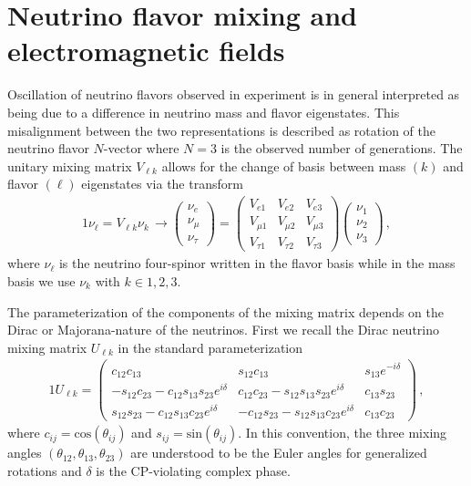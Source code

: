 \section{Neutrino flavor mixing and electromagnetic fields}
\label{sec:nuflavor}
Oscillation of neutrino flavors observed in experiment is in general interpreted as being due to a difference in neutrino mass and flavor eigenstates. This misalignment between the two representations is described as rotation of the neutrino flavor $N$-vector where $N=3$ is the observed number of generations. The unitary mixing matrix $V_{\ell k}$ allows for the change of basis between mass $(k)$ and flavor $(\ell)$ eigenstates via the transform 
\begin{alignat}{1}
    \label{basis:1} \nu_{\ell}=V_{\ell k}\nu_{k}\,\rightarrow
    \begin{pmatrix}
        \nu_{e}\\
        \nu_{\mu}\\
        \nu_{\tau}
    \end{pmatrix}=
    \begin{pmatrix}
        V_{e1} & V_{e2} & V_{e3}\\
        V_{\mu1} & V_{\mu2} & V_{\mu3}\\
        V_{\tau1} & V_{\tau2} & V_{\tau3}
    \end{pmatrix}
    \begin{pmatrix}
        \nu_{1}\\
        \nu_{2}\\
        \nu_{3}
    \end{pmatrix}\,,
\end{alignat}
where $\nu_{\ell}$ is the neutrino four-spinor written in the flavor basis while in the mass basis we use $\nu_{k}$ with $k\in1,2,3$.

The parameterization of the components of the mixing matrix depends on the Dirac or Majorana-nature of the neutrinos. First we recall the Dirac neutrino mixing matrix $U_{\ell k}$ in the standard parameterization~\citep{Xing:2014wwa,Schwartz:2014sze} 
\begin{alignat}{1}
    \label{rotation:1} U_{\ell k} =
    \begin{pmatrix}
         c_{12}c_{13} & s_{12}c_{13} & s_{13}e^{-i\delta}\\
         -s_{12}c_{23} - c_{12}s_{13}s_{23}e^{i\delta} & c_{12}c_{23} - s_{12}s_{13}s_{23}e^{i\delta} & c_{13}s_{23}\\
         s_{12}s_{23} - c_{12}s_{13}c_{23}e^{i\delta}& -c_{12}s_{23} - s_{12}s_{13}c_{23}e^{i\delta} & c_{13}c_{23}
    \end{pmatrix}\,,
\end{alignat}
where $c_{ij} = \mathrm{cos}(\theta_{ij})$ and $s_{ij} = \mathrm{sin}(\theta_{ij})$. In this convention, the three mixing angles $(\theta_{12}, \theta_{13}, \theta_{23})$ are understood to be the Euler angles for generalized rotations and $\delta$ is the CP-violating complex phase. 

